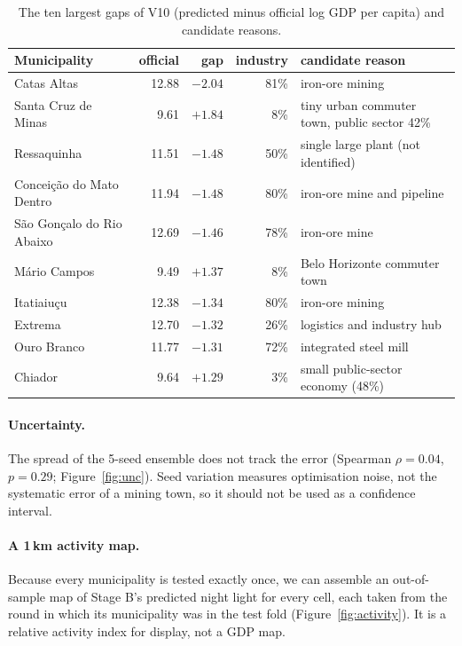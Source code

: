 \documentclass[11pt,a4paper]{article}
\begin{document}
\begin{table}[!htbp]
\centering\small
\caption{The ten largest gaps of V10 (predicted minus official log GDP per capita) and candidate reasons.}
\label{tab:top10}
\begin{tabular}{@{}lrrrl@{}}
\toprule
Municipality & official & gap & industry & candidate reason \\
\midrule
Catas Altas & 12.88 & $-2.04$ & 81\% & iron-ore mining \\
Santa Cruz de Minas & 9.61 & $+1.84$ & 8\% & tiny urban commuter town, public sector 42\% \\
Ressaquinha & 11.51 & $-1.48$ & 50\% & single large plant (not identified) \\
Conceição do Mato Dentro & 11.94 & $-1.48$ & 80\% & iron-ore mine and pipeline \\
São Gonçalo do Rio Abaixo & 12.69 & $-1.46$ & 78\% & iron-ore mine \\
Mário Campos & 9.49 & $+1.37$ & 8\% & Belo Horizonte commuter town \\
Itatiaiuçu & 12.38 & $-1.34$ & 80\% & iron-ore mining \\
Extrema & 12.70 & $-1.32$ & 26\% & logistics and industry hub \\
Ouro Branco & 11.77 & $-1.31$ & 72\% & integrated steel mill \\
Chiador & 9.64 & $+1.29$ & 3\% & small public-sector economy (48\%) \\
\bottomrule
\end{tabular}
\end{table}

\paragraph{Uncertainty.} The spread of the 5-seed ensemble does not track the error (Spearman $\rho=0.04$, $p=0.29$;
Figure~\ref{fig:unc}). Seed variation measures optimisation noise, not the systematic error of a mining town, so it
should not be used as a confidence interval.

\paragraph{A 1\,km activity map.} Because every municipality is tested exactly once, we can assemble an out-of-sample
map of Stage B's predicted night light for every cell, each taken from the round in which its municipality was in
the test fold (Figure~\ref{fig:activity}). It is a relative activity index for display, not a GDP map.
\end{document}
